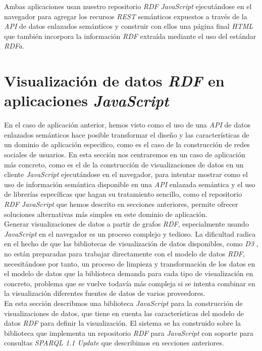 Ambas aplicaciones usan nuestro repositorio \textit{RDF} \textit{JavaScript} ejecut\'andose en el navegador para agregar los recursos \textit{REST} sem\'anticos expuestos a trav\'es de la \textit{API} de datos enlazados sem\'anticos y construir con ellos una p\'agina final \textit{HTML} que tambi\'en incorpora la informaci\'on \textit{RDF} extra\'ida mediante el uso del est\'andar \textit{RDFa}.

\section{Visualizaci\'on de datos \textit{RDF} en aplicaciones \textit{JavaScript}}

En el caso de aplicaci\'on anterior, hemos visto como el uso de una \textit{API} de datos enlazados sem\'anticos hace posible transformar el dise\~no y las caracter\'isticas de un dominio de aplicaci\'on especifico, como es el caso de la construcci\'on de redes sociales de usuarios. En esta secci\'on nos centraremos en un caso de aplicaci\'on m\'as concreto, como es el de la construcci\'on de visualizaciones de datos en un cliente \textit{JavaScript} ejecut\'andose en el navegador, para intentar mostrar como el uso de informaci\'on sem\'antica disponible en una \textit{API} enlazada sem\'antica y el uso de librer\'ias espec\'ificas que hagan su tratamiento sencillo, como el repositorio \textit{RDF} \textit{JavaScript} que hemos descrito en secciones anteriores, permite ofrecer soluciones alternativas m\'as simples en este dominio de aplicaci\'on.\\
Generar visualizaciones de datos a partir de grafos \textit{RDF}, especialmente usando \textit{JavaScript} en el navegador es un proceso complejo y tedioso. La dificultad radica en el hecho de que las bibliotecas de visualizaci\'on de datos disponibles, como \textit{D3} \cite{d3}, no est\'an preparadas para trabajar directamente con el modelo de datos \textit{RDF}, necesit\'andose por tanto, un proceso de limpieza y transformaci\'on de los datos en el modelo de datos que la biblioteca demanda para cada tipo de visualizaci\'on en concreto, problema que se vuelve todav\'ia m\'as compleja si se intenta combinar en la visualizaci\'on diferentes fuentes de datos de varios proveedores.\\
En esta secci\'on describmos una biblioteca \textit{JavaScript} para la construcci\'on de visualizaciones de datos, que tiene en cuenta las caracter\'isticas del modelo de datos \textit{RDF} para definir la visualizaci\'on. El sistema se ha construido sobre la biblioteca que implementa un repositorio \textit{RDF} para \textit{JavaScript} con soporte para consultas \textit{SPARQL 1.1 Update} que describimos en secciones anteriores.

